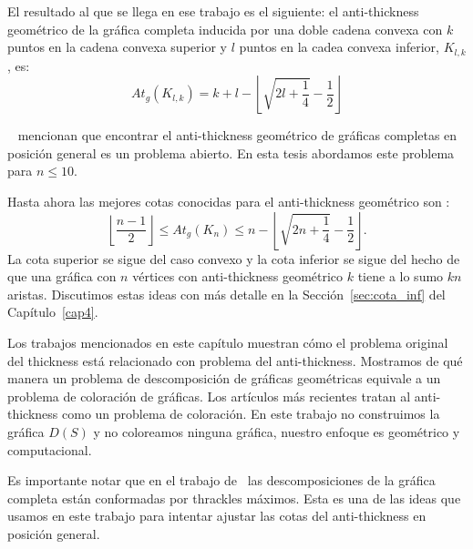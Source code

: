 El resultado al que se llega en ese trabajo es el siguiente: el anti-thickness
geométrico de la gráfica completa inducida por una doble cadena convexa con $k$
puntos en la cadena convexa superior y $l$ puntos en la cadea convexa inferior,
$K_{l,k}$, es:
 \[At_g(K_{l,k}) = k+l-\left\lfloor \sqrt{2l+\frac{1}{4}} - \frac{1}{2} \right\rfloor\]

 ~\cite{Dujmovic2017} mencionan que encontrar el anti-thickness geométrico de
 gráficas completas en posición general es un problema abierto. En esta tesis
 abordamos este problema para $n\leq 10$.

 Hasta ahora las mejores cotas conocidas para el anti-thickness geométrico son :
 \begin{equation}
   \left\lfloor\frac{n-1}{2}\right\rfloor \leq At_g(K_n) \leq n - \left\lfloor
 \sqrt{2n + \frac{1}{4}} - \frac{1}{2} \right\rfloor.
\end{equation}
 La cota superior se sigue del caso convexo y la cota inferior
 se sigue del hecho de que una gráfica con $n$ vértices
 con anti-thickness geométrico $k$ tiene a lo sumo $kn$ aristas. Discutimos
 estas ideas con más detalle en la Sección~\ref{sec:cota_inf} del Capítulo~\ref{cap4}.

Los trabajos mencionados en este capítulo muestran cómo el problema original del
thickness está relacionado con problema del anti-thickness. Mostramos de qué
manera un problema de descomposición de gráficas geométricas equivale
a un problema de coloración de gráficas. Los artículos más recientes tratan al
anti-thickness como un problema de coloración. En este trabajo no construimos la
gráfica $D(S)$ y no coloreamos ninguna gráfica, nuestro enfoque es geométrico
y computacional.


Es importante notar que en el trabajo de~\cite{Fabila-Monroy2018} las
descomposiciones de la gráfica completa están conformadas por thrackles máximos. Esta es una de las ideas que usamos en este trabajo para intentar ajustar las cotas del anti-thickness en posición general.
